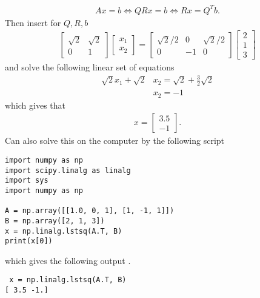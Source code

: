\documentclass[12pt,
               a4paper,
               article,
               oneside,
               norsk,oldfontcommands]{memoir}
\begin{document}
\begin{align*}
Ax = b \iff QRx = b \iff Rx = Q^Tb.
\end{align*}
Then insert for $Q, R, b$
\begin{align*}
\begin{bmatrix}
\sqrt{2} & \sqrt{2} \\[5pt]
0 & 1
\end{bmatrix} 
\begin{bmatrix}
x_1 \\
x_2
\end{bmatrix}
=
\begin{bmatrix}
\sqrt{2}/2 & 0 & \sqrt{2}/2  \\[5pt]
0 & -1 & 0
\end{bmatrix}
\begin{bmatrix}
2 \\
1 \\
3
\end{bmatrix}
\end{align*}
and solve the following linear set of equations 
\begin{align}
\sqrt{2}x_1 + \sqrt{2}&x_2  = \sqrt{2} + \frac{3}{2} \sqrt{2} \\[5pt]
 &x_2 = -1
\end{align}
which gives that 
\begin{align*}
x = \begin{bmatrix}
3.5 \\
-1
\end{bmatrix}.
\end{align*}
Can also solve this on the computer by the following script 
\begin{lstlisting}
import numpy as np
import scipy.linalg as linalg
import sys
import numpy as np

A = np.array([[1.0, 0, 1], [1, -1, 1]])
B = np.array([2, 1, 3])
x = np.linalg.lstsq(A.T, B)
print(x[0])
\end{lstlisting}
which gives the following output .
\begin{verbatim}
 x = np.linalg.lstsq(A.T, B)
[ 3.5 -1.]
\end{verbatim}
\end{document}
